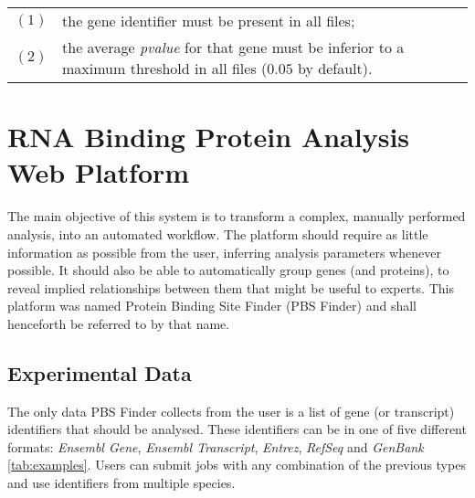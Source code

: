 \begin{table}[H]
  \begin{tabular}{l p{}}
    $(1)$ & the gene identifier must be present in all files;\\
    $(2)$ & the average \emph{pvalue} for that gene must be inferior to a
    maximum threshold in all files ($0.05$ by default).\\
  \end{tabular}
\end{table}

\section{RNA Binding Protein Analysis Web Platform}


The main objective of this system is to transform a complex, manually performed
analysis, into an automated workflow. The platform should require as little
information as possible from the user, inferring analysis parameters whenever
possible. It should also be able to automatically group genes (and proteins), to
reveal implied relationships between them that might be useful to experts. This
platform was named Protein Binding Site Finder (PBS Finder) and shall henceforth
be referred to by that name.

\subsection{Experimental Data}

The only data PBS Finder collects from the user is a list of gene (or
transcript) identifiers that should be analysed. These identifiers can be in one
of five different formats: \emph{Ensembl Gene}, \emph{Ensembl Transcript},
\emph{Entrez}, \emph{RefSeq} and \emph{GenBank} \ref{tab:examples}. Users can
submit jobs with any combination of the previous types and use identifiers from
multiple species.

